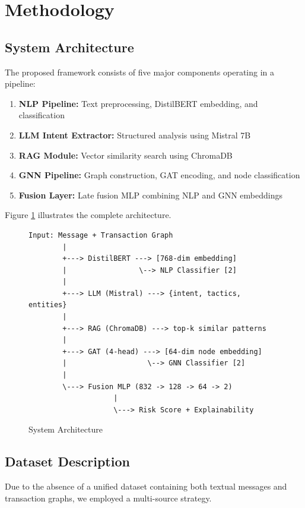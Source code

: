 \section{Methodology}

\subsection{System Architecture}

The proposed framework consists of five major components operating in a pipeline:

\begin{enumerate}
    \item \textbf{NLP Pipeline:} Text preprocessing, DistilBERT embedding, and classification
    \item \textbf{LLM Intent Extractor:} Structured analysis using Mistral 7B
    \item \textbf{RAG Module:} Vector similarity search using ChromaDB
    \item \textbf{GNN Pipeline:} Graph construction, GAT encoding, and node classification
    \item \textbf{Fusion Layer:} Late fusion MLP combining NLP and GNN embeddings
\end{enumerate}

Figure \ref{fig:architecture} illustrates the complete architecture.

\begin{figure}[h]
\centering
\begin{verbatim}
Input: Message + Transaction Graph
        |
        +---> DistilBERT ---> [768-dim embedding]
        |                 \--> NLP Classifier [2]
        |
        +---> LLM (Mistral) ---> {intent, tactics, entities}
        |
        +---> RAG (ChromaDB) ---> top-k similar patterns
        |
        +---> GAT (4-head) ---> [64-dim node embedding]
        |                   \--> GNN Classifier [2]
        |
        \---> Fusion MLP (832 -> 128 -> 64 -> 2)
                    |
                    \---> Risk Score + Explainability
\end{verbatim}
\caption{System Architecture}
\label{fig:architecture}
\end{figure}

\subsection{Dataset Description}

Due to the absence of a unified dataset containing both textual messages and transaction graphs, we employed a multi-source strategy.

